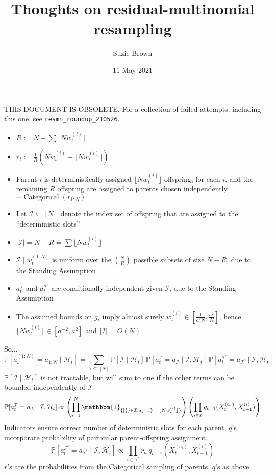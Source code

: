 \documentclass{article}
\title{Thoughts on residual-multinomial resampling}
\author{Suzie Brown}
\date{11 May 2021}
\newcommand{\Prob}{\mathbb{P}}
\newcommand{\I}[1]{\mathbbm{1}_{\{#1\}}}
\newcommand{\1}[1]{\mathbbm{1}_{#1}}
\newcommand{\flnw}[1][i]{\lfloor N w_t^{(#1)} \rfloor}
\newcommand{\Cat}{\operatorname{Categorical}}
\begin{document}
\maketitle
\thispagestyle{fancy}

{THIS DOCUMENT IS OBSOLETE. For a collection of failed attempts, including this one, see \texttt{resmn\_roundup\_210526}. }

\begin{itemize}
\item $R:= N - \sum \flnw$ 
\item $r_i := \frac{1}{R} ( Nw_t^{(i)} - \flnw )$
\item Parent $i$ is deterministically assigned $\flnw$ offspring, for each $i$, and the remaining $R$ offspring are assigned to parents chosen independently $\sim \Cat(r_{1:N})$
\item Let $\mathcal{I} \subseteq [N]$ denote the index set of offspring that are assigned to the ``deterministic slots''
\item $|\mathcal{I}| = N-R = \sum \flnw$
\item $\mathcal{I} \mid w_t^{(1:N)}$ is uniform over the $\binom{N}{R}$ possible subsets of size $N-R$, due to the Standing Assumption
\item $a_t^{\mathcal{I}}$ and $a_t^{\mathcal{I}^c}$ are conditionally independent given $\mathcal{I}$, due to the Standing Assumption
\item The assumed bounds on $g_t$ imply almost surely $w_t^{(i)} \in [ \frac{1}{a^2 N}, \frac{a^2}{N} ]$, hence $\flnw \in [a^{-2}, a^2] $ and $|\mathcal{I}|= O(N)$
\end{itemize}
So...
\begin{equation}
\Prob[ a_t^{(1:N)} = a_{1:N} \mid \mathcal{H}_t ]
= \sum_{\mathcal{I}\subseteq[N]} \Prob[ \mathcal{I} \mid \mathcal{H}_t ]
        \, \Prob[ a_t^{\mathcal{I}} = a_{\mathcal{I}} \mid \mathcal{I}, \mathcal{H}_t ]
        \, \Prob[ a_t^{\mathcal{I}^c} = a_{\mathcal{I}^c} \mid \mathcal{I}, \mathcal{H}_t ]
\end{equation}
$\Prob[ \mathcal{I} \mid \mathcal{H}_t ]$ is not tractable, but will sum to one if the other terms can be bounded independently of $\mathcal{I}$.
\begin{equation}
\Prob[ a_t^{\mathcal{I}} = a_{\mathcal{I}} \mid \mathcal{I}, \mathcal{H}_t ]
\propto \left( \prod_{i=1}^N \I{ |\{ j \in \mathcal{I} : a_j =i \}| = \flnw } \right)
        \left( \prod_{i\in\mathcal{I}} q_{t-1}(X_t^{(a_i)}, X_{t-1}^{(i)} ) \right)
\end{equation}
Indicators ensure correct number of deterministic slots for each parent, $q$'s incorporate probability of particular parent-offspring assignment.
\begin{equation}
\Prob[ a_t^{\mathcal{I}^c} = a_{\mathcal{I}^c} \mid \mathcal{I}, \mathcal{H}_t ]
\propto \prod_{i\in\mathcal{I}^c} r_{a_i} q_{t-1}(X_t^{(a_i)}, X_{t-1}^{(i)} ) 
\end{equation}
$r$'s are the probabilities from the Categorical sampling of parents, $q$'s as above.
\end{document}

